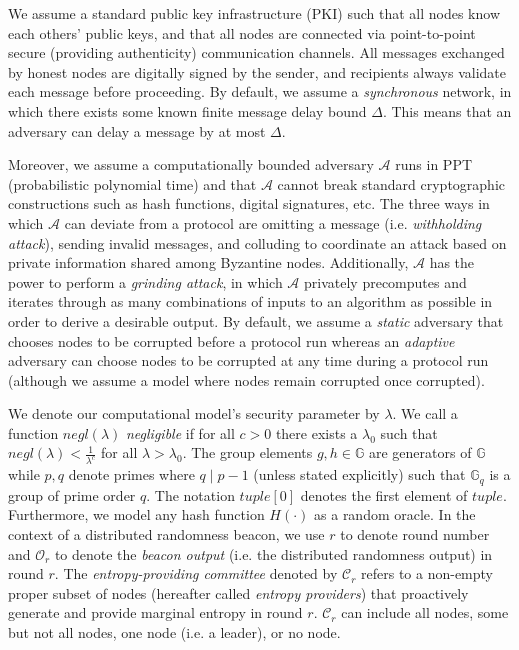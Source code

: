 \documentclass[conference]{IEEEtran}
\theoremstyle{definition}
\theoremstyle{remark}
\begin{document}
We assume a standard public key infrastructure (PKI) such that all nodes know each others' public keys, and that all nodes are connected via point-to-point secure (providing authenticity) communication channels. All messages exchanged by honest nodes are digitally signed by the sender, and recipients always validate each message before proceeding. By default, we assume a \textit{synchronous} network, in which there exists some known finite message delay bound $\Delta$. This means that an adversary can delay a message by at most $\Delta$.

Moreover, we assume a computationally bounded adversary $\mathcal{A}$ runs in PPT (probabilistic polynomial time) and that $\mathcal{A}$ cannot break standard cryptographic constructions such as hash functions, digital signatures, etc. The three ways in which $\mathcal{A}$ can deviate from a protocol are omitting a message (i.e. \textit{withholding attack}), sending invalid messages, and colluding to coordinate an attack based on private information shared among Byzantine nodes. Additionally, $\mathcal{A}$ has the power to perform a \textit{grinding attack}, in which $\mathcal{A}$ privately precomputes and iterates through as many combinations of inputs to an algorithm as possible in order to derive a desirable output. By default, we assume a \textit{static} adversary that chooses nodes to be corrupted before a protocol run whereas an \textit{adaptive} adversary can choose nodes to be corrupted at any time during a protocol run (although we assume a model where nodes remain corrupted once corrupted).

We denote our computational model's security parameter by $\lambda$. We call a function $negl(\lambda)$ \textit{negligible} if for all $c > 0$ there exists a $\lambda_0$ such that $negl(\lambda) < \frac{1}{\lambda^c}$ for all $\lambda > \lambda_0$. The group elements $g, h \in \mathbb{G}$ are generators of $\mathbb{G}$ while $p, q$ denote primes where $q \mid p - 1$ (unless stated explicitly) such that $\mathbb{G}_q$ is a group of prime order $q$. The notation $tuple[0]$ denotes the first element of $tuple$. Furthermore, we model any hash function $H(\cdot)$ as a random oracle. In the context of a distributed randomness beacon, we use $r$ to denote round number and $\mathcal{O}_r$ to denote the \textit{beacon output} (i.e. the distributed randomness output) in round $r$. The \textit{entropy-providing committee} denoted by $\mathcal{C}_r$ refers to a non-empty proper subset of nodes (hereafter called \textit{entropy providers}) that proactively generate and provide marginal entropy in round $r$. $\mathcal{C}_r$ can include all nodes, some but not all nodes, one node (i.e. a leader), or no node.
\end{document}
